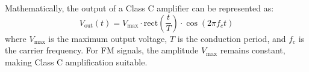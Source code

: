 Mathematically, the output of a Class C amplifier can be represented as:
\[
V_{\text{out}}(t) = V_{\text{max}} \cdot \text{rect}\left(\frac{t}{T}\right) \cdot \cos(2\pi f_c t)
\]
where \( V_{\text{max}} \) is the maximum output voltage, \( T \) is the conduction period, and \( f_c \) is the carrier frequency. For FM signals, the amplitude \( V_{\text{max}} \) remains constant, making Class C amplification suitable.

